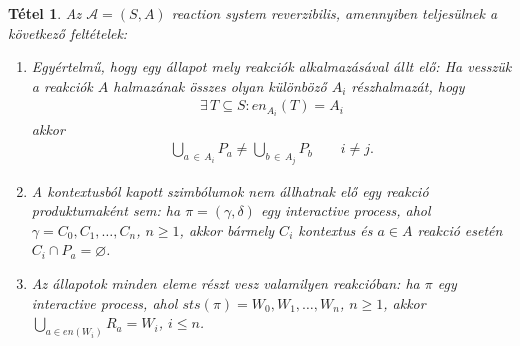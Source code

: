 \documentclass[12pt]{article}
\theoremstyle{definition}
\theoremstyle{remark}
\theoremstyle{plain}
\newtheorem*{theorem*}{Tétel}
\let\emptyset\varnothing
\newcommand{\en}{\textit{en}}
\begin{document}
    \begin{theorem*}
        Az $\mathscr{A} = (S, A)$ \textit{reaction system} reverzibilis, amennyiben teljesülnek a következő feltételek:
        \begin{enumerate}[label={(\arabic*)}]
            \item
            Egyértelmű, hogy egy állapot mely reakciók alkalmazásával állt elő: Ha vesszük a reakciók $A$ halmazának összes olyan különböző $A_i$ részhalmazát, hogy
            \begin{align*}
                \exists \, T \subseteq S : \en_{A_{i}}(T) = A_{i}
            \end{align*}
            akkor
            \begin{align*}
                \bigcup\limits_{a \,\in\, A_{i}} P_{a} \neq \bigcup\limits_{b \,\in\, A_{j}} P_{b} \qquad i \neq j.
            \end{align*}
            \item
            A kontextusból kapott szimbólumok nem állhatnak elő egy reakció produktumaként sem: ha $\pi = (\gamma, \delta)$ egy \textit{interactive process}, ahol $\gamma = C_{0}, C_{1}, \ldots, C_{n}$, $n \geq 1$, akkor bármely $C_{i}$ kontextus és $a \in A$ reakció esetén $C_{i} \cap P_{a} = \emptyset$.

            \item
            Az állapotok minden eleme részt vesz valamilyen reakcióban: ha $\pi$ egy \textit{interactive process}, ahol $\textit{sts}(\pi) = W_{0}, W_{1}, \ldots, W_{n}$, $n \geq 1$, akkor $\bigcup_{a \in \textit{en}(W_{i})} R_{a} = W_{i}$, $i \leq n$.
        \end{enumerate}
    \end{theorem*}
\end{document}
